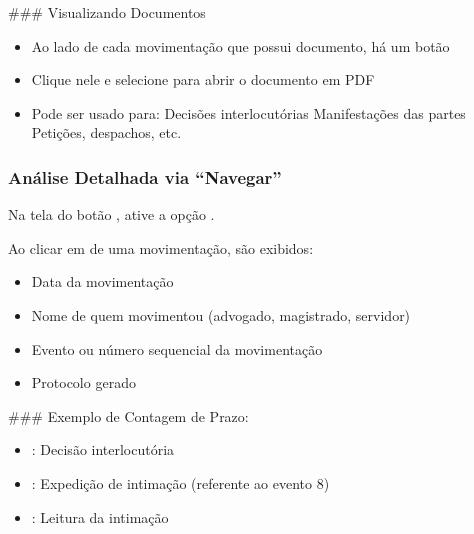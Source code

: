 \documentclass[letterpaper,10pt,brazil]{sphinxmanual}
\begin{document}
\sphinxAtStartPar
\#\#\# Visualizando Documentos
\begin{itemize}
\item {} 
\sphinxAtStartPar
Ao lado de cada movimentação que possui documento, há um botão 

\item {} 
\sphinxAtStartPar
Clique nele e selecione  para abrir o documento em PDF

\item {} 
\sphinxAtStartPar
Pode ser usado para:
\sphinxhyphen{} Decisões interlocutórias
\sphinxhyphen{} Manifestações das partes
\sphinxhyphen{} Petições, despachos, etc.

\end{itemize}


\subsubsection{Análise Detalhada via “Navegar”}
\label{\detokenize{projud_17_visualizandomovimentos:analise-detalhada-via-navegar}}
\sphinxAtStartPar
Na tela do botão , ative a opção .

\sphinxAtStartPar
Ao clicar em  de uma movimentação, são exibidos:
\begin{itemize}
\item {} 
\sphinxAtStartPar
Data da movimentação

\item {} 
\sphinxAtStartPar
Nome de quem movimentou (advogado, magistrado, servidor)

\item {} 
\sphinxAtStartPar
Evento ou número sequencial da movimentação

\item {} 
\sphinxAtStartPar
Protocolo gerado

\end{itemize}

\sphinxAtStartPar
\#\#\# Exemplo de Contagem de Prazo:
\begin{itemize}
\item {} 
\sphinxAtStartPar
{}: Decisão interlocutória

\item {} 
\sphinxAtStartPar
{}: Expedição de intimação (referente ao evento 8)

\item {} 
\sphinxAtStartPar
{}: Leitura da intimação

\end{itemize}
\end{document}
